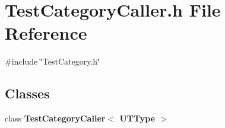 \section{Test\+Category\+Caller.\+h File Reference}
\label{TestCategoryCaller_8h}
{\ttfamily \#include \char`\"{}Test\+Category.\+h\char`\"{}}\newline
\subsection*{Classes}
\begin{DoxyCompactItemize}
\item 
class \textbf{ Test\+Category\+Caller$<$ U\+T\+Type $>$}
\end{DoxyCompactItemize}
